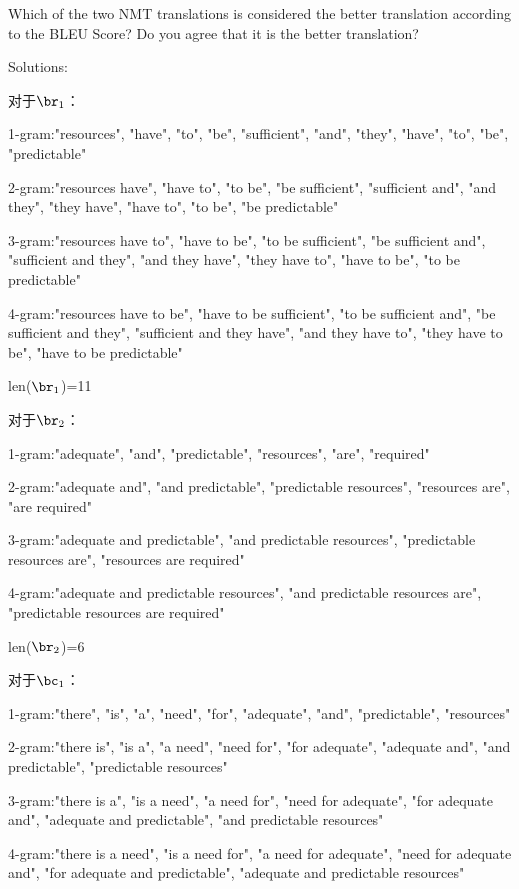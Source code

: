 \begin{parts}
\begin{subparts}
        Which of the two NMT translations is considered the better translation according to the BLEU Score? Do you agree that it is the better translation?
        
        {\color{red}Solutions:
        
        对于$\br_{1}$：

        1-gram:{"resources", "have", "to", "be", "sufficient", "and", "they", "have", "to", "be", "predictable"}

        2-gram:{"resources have", "have to", "to be", "be sufficient", "sufficient and", "and they", "they have", "have to", "to be", "be predictable"}

        3-gram:{"resources have to", "have to be", "to be sufficient", "be sufficient and", "sufficient and they", "and they have", "they have to", "have to be", "to be predictable"}
        
        4-gram:{"resources have to be", "have to be sufficient", "to be sufficient and", "be sufficient and they", "sufficient and they have", "and they have to", "they have to be", "have to be predictable"}

        len($\br_{1}$)=11

        对于$\br_{2}$：

        1-gram:{"adequate", "and", "predictable", "resources", "are", "required"}

        2-gram:{"adequate and", "and predictable", "predictable resources", "resources are", "are required"}

        3-gram:{"adequate and predictable", "and predictable resources", "predictable resources are", "resources are required"}
        
        4-gram:{"adequate and predictable resources", "and predictable resources are", "predictable resources are required"}

        len($\br_{2}$)=6

        对于$\bc_{1}$：

        1-gram:{"there", "is", "a", "need", "for", "adequate", "and", "predictable", "resources"}

        2-gram:{"there is", "is a", "a need", "need for", "for adequate", "adequate and", "and predictable", "predictable resources"}

        3-gram:{"there is a", "is a need", "a need for", "need for adequate", "for adequate and", "adequate and predictable", "and predictable resources"}
        
        4-gram:{"there is a need", "is a need for", "a need for adequate", "need for adequate and", "for adequate and predictable", "adequate and predictable resources"}

}
\end{subparts}
\end{parts}
